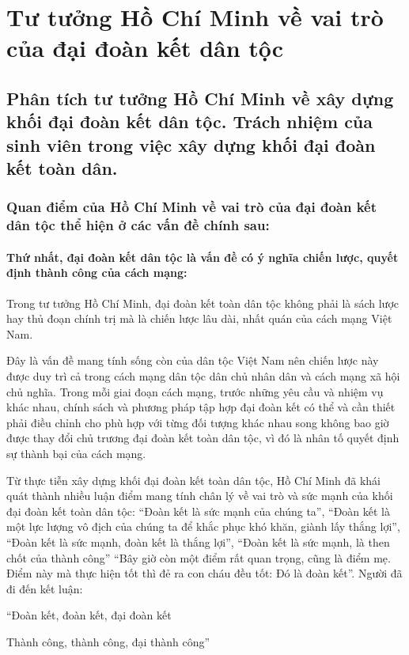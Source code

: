 \section{Tư tưởng Hồ Chí Minh về vai trò của đại đoàn kết dân tộc}

\subsection{Phân tích tư tưởng Hồ Chí Minh về xây dựng khối đại đoàn kết dân tộc. Trách nhiệm của sinh viên trong việc xây dựng khối đại đoàn kết toàn dân.}

\subsubsection{Quan điểm của Hồ Chí Minh về vai trò của đại đoàn kết dân tộc thể hiện ở các vấn đề chính sau:}

\paragraph{Thứ nhất, đại đoàn kết dân tộc là vấn đề có ý nghĩa chiến lược, quyết định thành công của cách mạng:}
Trong tư tưởng Hồ Chí Minh, đại đoàn kết toàn dân tộc không phải là sách lược hay thủ đoạn chính trị mà là chiến lược lâu dài, nhất quán của cách mạng Việt Nam.

Đây là vấn đề mang tính sống còn của dân tộc Việt Nam nên chiến lược này được duy trì cả trong cách mạng dân tộc dân chủ nhân dân và cách mạng xã hội chủ nghĩa. Trong mỗi giai đoạn cách mạng, trước những yêu cầu và nhiệm vụ khác nhau, chính sách và phương pháp tập hợp đại đoàn kết có thể và cần thiết phải điều chỉnh cho phù hợp với từng đối tượng khác nhau song không bao giờ được thay đổi chủ trương đại đoàn kết toàn dân tộc, vì đó là nhân tố quyết định sự thành bại của cách mạng.

Từ thực tiễn xây dựng khối đại đoàn kết toàn dân tộc, Hồ Chí Minh đã khái quát thành nhiều luận điểm mang tính chân lý về vai trò và sức mạnh của khối đại đoàn kết toàn dân tộc: “Đoàn kết là sức mạnh của chúng ta”, “Đoàn kết là một lực lượng vô địch của chúng ta để khắc phục khó khăn, giành lấy thắng lợi”, “Đoàn kết là sức mạnh, đoàn kết là thắng lợi”, “Đoàn kết là sức mạnh, là then chốt của thành công” “Bây giờ còn một điểm rất quan trọng, cũng là điểm mẹ. Điểm này mà thực hiện tốt thì đẻ ra con cháu đều tốt: Đó là đoàn kết”. Người đã đi đến kết luận:
\begin{center}
    “Đoàn kết, đoàn kết, đại đoàn kết
    
    Thành công, thành công, đại thành công”    
\end{center}

